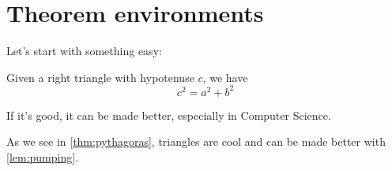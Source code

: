 \documentclass[a4paper]{article}
\begin{document}
\section{Theorem environments}

Let's start with something easy:

\begin{thm}\label{thm:pythagoras} 

Given a right triangle with hypotenuse $c$, we have
$$
  c^2 = a^2 + b^2
$$

\end{thm}

\begin{lem}[Pumping]\label{lem:pumping} 

If it's good, it can be made better, especially in Computer Science.

\end{lem}

As we see in \cref{thm:pythagoras}, triangles are cool and can be made better with \cref{lem:pumping}.

\printbibliography
\end{document}
